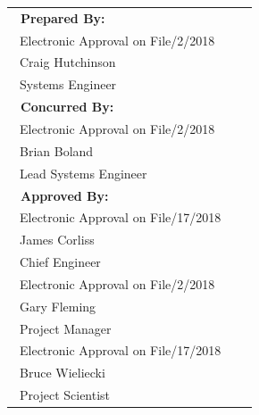 \documentclass[12pt,oneside,oldfontcommands]{memoir}
\begin{document}
\begin{table}[htbp]
\begin{minipage}{\linewidth}
\centering
\small
\begin{tabulary}{\textwidth}{p{3.325in}p{0.225in}p{2.5in}}
\bfseries{~Prepared By:} & & \\[0.35in]
~Electronic Approval on File\qquad\qquad{}/2/2018\\
\cmidrule(l){1-1}%
~Craig Hutchinson\\
~Systems Engineer\\[0.25in]
\bfseries{~Concurred By:} & & \\[0.35in]
~Electronic Approval on File\qquad\qquad{}/2/2018\\
\cmidrule(l){1-1}%
~Brian Boland & &  \\
~Lead Systems Engineer & &  \\[0.35in]
\bfseries{~Approved By:} & & \\[0.35in]
~Electronic Approval on File\qquad\qquad{}/17/2018\\
\cmidrule(l){1-1}%
~James Corliss & &  \\
~Chief Engineer & &  \\[0.35in]
~Electronic Approval on File\qquad\qquad{}/2/2018\\
\cmidrule(l){1-1}%
~Gary Fleming & &  \\
~Project Manager & &  \\[0.35in]
~Electronic Approval on File\qquad\qquad{}/17/2018\\
\cmidrule(l){1-1}%
~Bruce Wieliecki & &  \\
~Project Scientist & &  \\[0.4in]
\end{tabulary}
\end{minipage}
\end{table}
\clearpage%
\end{document}
